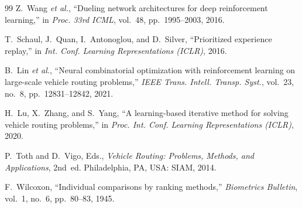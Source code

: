 \begin{thebibliography}{99}
Z.~Wang \textit{et al.},
``Dueling network architectures for deep reinforcement learning,''
in \textit{Proc. 33rd ICML}, vol.~48, pp.~1995--2003, 2016.

T.~Schaul, J.~Quan, I.~Antonoglou, and D.~Silver,
``Prioritized experience replay,''
in \textit{Int. Conf. Learning Representations (ICLR)}, 2016.

B.~Lin \textit{et al.},
``Neural combinatorial optimization with reinforcement learning on large-scale vehicle routing problems,''
\textit{IEEE Trans. Intell. Transp. Syst.}, vol.~23, no.~8, pp.~12831--12842, 2021.

H.~Lu, X.~Zhang, and S.~Yang,
``A learning-based iterative method for solving vehicle routing problems,''
in \textit{Proc. Int. Conf. Learning Representations (ICLR)}, 2020.

P.~Toth and D.~Vigo, Eds.,
\textit{Vehicle Routing: Problems, Methods, and Applications}, 2nd~ed.
Philadelphia, PA, USA: SIAM, 2014.

F.~Wilcoxon,
``Individual comparisons by ranking methods,''
\textit{Biometrics Bulletin}, vol.~1, no.~6, pp.~80--83, 1945.

\end{thebibliography}
